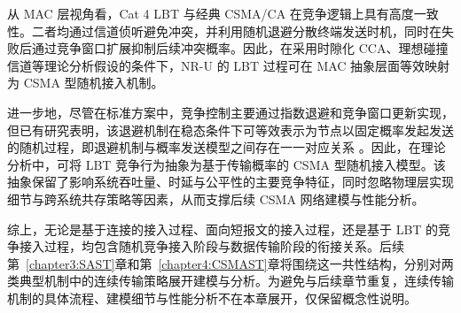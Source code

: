 

从 MAC 层视角看，Cat 4 LBT 与经典 CSMA/CA 在竞争逻辑上具有高度一致性。二者均通过信道侦听避免冲突，并利用随机退避分散终端发送时机，同时在失败后通过竞争窗口扩展抑制后续冲突概率。因此，在采用时隙化 CCA、理想碰撞信道等理论分析假设的条件下，NR-U 的 LBT 过程可在 MAC 抽象层面等效映射为 CSMA 型随机接入机制。

进一步地，尽管在标准方案中，竞争控制主要通过指数退避和竞争窗口更新实现，但已有研究表明，该退避机制在稳态条件下可等效表示为节点以固定概率发起发送的随机过程，即退避机制与概率发送模型之间存在一一对应关系 \cite{2000_BianchiDCF, 2013_DaiSunDCF}。因此，在理论分析中，可将 LBT 竞争行为抽象为基于传输概率的 CSMA 型随机接入模型。该抽象保留了影响系统吞吐量、时延与公平性的主要竞争特征，同时忽略物理层实现细节与跨系统共存策略等因素，从而支撑后续 CSMA 网络建模与性能分析。

综上，无论是基于连接的接入过程、面向短报文的接入过程，还是基于 LBT 的竞争接入过程，均包含随机竞争接入阶段与数据传输阶段的衔接关系。后续第~\ref{chapter3:SAST}章和第~\ref{chapter4:CSMAST}章将围绕这一共性结构，分别对两类典型机制中的连续传输策略展开建模与分析。为避免与后续章节重复，连续传输机制的具体流程、建模细节与性能分析不在本章展开，仅保留概念性说明。

%
%
%
%


